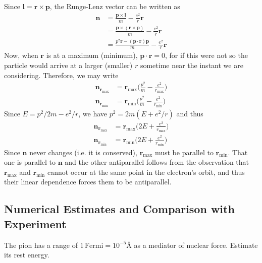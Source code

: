 \documentclass[../principles-of-quantum-mechanics.tex]{subfiles}
\begin{document}
\begin{questions}
	\begin{solution}
		Since $\mathbf{l} = \mathbf{r}\times\mathbf{p}$, the Runge-Lenz vector can be written as
		\begin{align*}
			\mathbf{n} &= \frac{\mathbf{p}\times\mathbf{l}}{m} - \frac{e^2}{r}\mathbf{r} \\
			&= \frac{\mathbf{p}\times\mathbf{(\mathbf{r}\times\mathbf{p})}}{m} - \frac{e^2}{r}\mathbf{r} \\
			&= \frac{p^2\mathbf{r} - (\mathbf{p}\cdot\mathbf{r})\mathbf{p}}{m} - \frac{e^2}{r}\mathbf{r}
		\end{align*}
		Now, when $\mathbf{r}$ is at a maximum (minimum), $\mathbf{p}\cdot\mathbf{r} = 0$, for if this were not so the particle would arrive at a larger (smaller) $r$ sometime near the instant we are considering. Therefore, we may write
		\begin{align*}
			\mathbf{n}_{\mathbf{r}_{\text{max}}} &= \mathbf{r}_{\text{max}}\Big(\frac{p^2}{m} - \frac{e^2}{r_{\text{max}}}\Big) \\
			\mathbf{n}_{\mathbf{r}_{\text{min}}} &= \mathbf{r}_{\text{min}}\Big(\frac{p^2}{m} - \frac{e^2}{r_{\text{min}}}\Big)
		\end{align*}
		Since $E = p^2/2m - e^2/r$, we have $p^2 = 2m(E + e^2/r)$ and thus
		\begin{align*}
			\mathbf{n}_{\mathbf{r}_{\text{max}}} &= \mathbf{r}_{\text{max}}\Big(2E + \frac{e^2}{r_{\text{max}}}\Big) \\
			\mathbf{n}_{\mathbf{r}_{\text{min}}} &= \mathbf{r}_{\text{min}}\Big(2E + \frac{e^2}{r_{\text{min}}}\Big)
		\end{align*}
		Since $\mathbf{n}$ never changes (i.e. it is conserved), $\mathbf{r}_{\text{max}}$ must be parallel to $\mathbf{r}_{\text{min}}$. That one is parallel to $\mathbf{n}$ and the other antiparallel follows from the observation that $\mathbf{r}_{\text{max}}$ and $\mathbf{r}_{\text{min}}$ cannot occur at the same point in the electron's orbit, and thus their linear dependence forces them to be antiparallel.
	\end{solution}

	\setcounter{subsection}{2}
	\subsection{Numerical Estimates and Comparison with Experiment}
	\setcounter{question}{0}
	
	\question The pion has a range of $1\,\text{Fermi} = 10^{-5}\text{\AA}$ as a mediator of nuclear force. Estimate its rest energy.
	

\end{questions}
\end{document}

